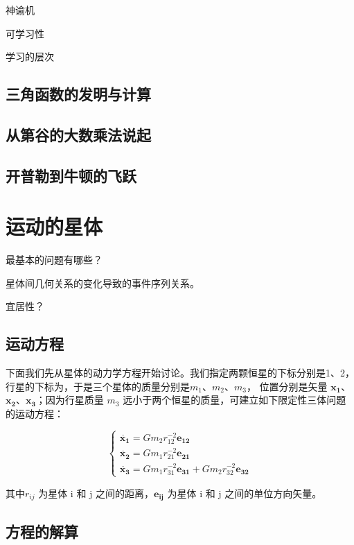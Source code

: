 \documentclass[a4paper,10.5pt]{book}
\begin{document}
神谕机

可学习性

学习的层次

\section{三角函数的发明与计算}

\section{从第谷的大数乘法说起}

\section{开普勒到牛顿的飞跃}




\chapter{运动的星体}

最基本的问题有哪些？

星体间几何关系的变化导致的事件序列关系。

宜居性？

\section{运动方程}

下面我们先从星体的动力学方程开始讨论。我们指定两颗恒星的下标分别是1、2，行星的下标为，于是三个星体的质量分别是$m_1$、$m_2$、$m_3$，
位置分别是矢量 $\mathbf{x_1}$、$\mathbf{x_2}$、$\mathbf{x_3}$；因为行星质量 $m_3$ 远小于两个恒星的质量，可建立如下限定性三体问题的运动方程：

$$
\begin{cases}
\ddot{\mathbf{x_1}} = Gm_2r_{12}^{-2} \mathbf{e_{12}}\\
\ddot{\mathbf{x_2}} = Gm_1r_{21}^{-2} \mathbf{e_{21}}\\
\ddot{\mathbf{x_3}} = Gm_1r_{31}^{-2} \mathbf{e_{31}} + Gm_2r_{32}^{-2} \mathbf{e_{32}}
\end{cases}
$$

其中$r_{ij}$ 为星体 i 和 j 之间的距离，$\mathbf{e_{ij}}$ 为星体 i 和 j 之间的单位方向矢量。

\section{方程的解算}
\end{document}
